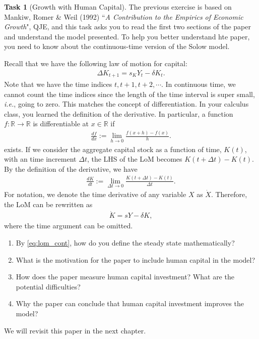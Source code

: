 \documentclass{book}
\theoremstyle{definition}
\newtheorem{task}{Task}[chapter]
\theoremstyle{plain}
\begin{document}
\begin{task}[Growth with Human Capital]
    The previous exercise is based on Mankiw, Romer \& Weil (1992) ``\textit{A Contribution to the Empirics of Economic Growth}", QJE, and this task asks you to read the first two sections of the paper and understand the model presented. To help you better understand hte paper, you need to know about the continuous-time version of the Solow model.

    Recall that we have the following law of motion for capital:
    \begin{align*}
        \Delta K_{t+1} = s_K Y_t -\delta K_t.
    \end{align*}
    Note that we have the time indices $t, t+1, t+2, \cdots$. In continuous time, we cannot count the time indices since the length of the time interval is super small, \textit{i.e.}, going to zero. This matches the concept of differentiation. In your calculus class, you learned the definition of the derivative. In particular, a function $f:\mathbb{R} \to \mathbb{R}$ is differentiable at $x\in\mathbb{R}$ if
    \begin{align*}
        \frac{d f}{d x} := \lim_{h\to 0} \frac{f(x+h) - f(x)}{h}.
    \end{align*}
    exists. If we consider the aggregate capital stock as a function of time, $K(t)$, with an time increment $\Delta t$, the LHS of the LoM becomes $K(t+\Delta t) - K(t)$. By the definition of the derivative, we have
    \begin{align*}
        \frac{d K}{d t} := \lim_{\Delta t\to 0} \frac{K(t+\Delta t) - K(t)}{\Delta t}.
    \end{align*}
    For notation, we denote the time derivative of any variable $X$ as $\dot{X}$. Therefore, the LoM can be rewritten as
    \begin{align}\label{eq:lom_cont}
        \dot{K} = s Y - \delta K,
    \end{align}
    where the time argument can be omitted. 
    \begin{enumerate}[label=\arabic*.]
        \item By \eqref{eq:lom_cont}, how do you define the steady state mathematically?
        \item What is the motivation for the paper to include human capital in the model?
        \item How does the paper measure human capital investment? What are the potential difficulties?
        \item Why the paper can conclude that human capital investment improves the model?
    \end{enumerate}    
    We will revisit this paper in the next chapter.
\end{task}
\end{document}
